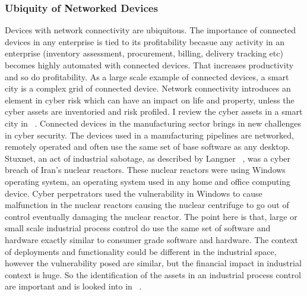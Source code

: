 \subsubsection{Ubiquity of Networked Devices}\label{sec:network_dev}
Devices with network connectivity are ubiquitous. The importance of connected devices in any enterprise is tied to its profitability becasue any activity in an enterprise (inventory assessment, procurement, billing, delivery tracking etc) becomes highly automated with connected devices. That increases productivity and so do profitability. As a large scale example of connected devices, a smart city is a complex grid of connected device. Network connectivity introduces an element in cyber risk which can have an impact on life and property, unless the cyber assets are inventoried and risk profiled. I review the cyber assets in a smart city in ~\cite{7580812}.
Connected devices in the manufacturing sector brings in new challenges in cyber security. The devices used in a manufacturing pipelines are networked, remotely operated and often use the same set of base software as any desktop. Stuxnet, an act of industrial sabotage, as described by Langner ~\cite{5772960}, was a cyber breach of Iran's nuclear reactors. These nuclear reactors were using Windows operating system, an operating system used in any home and office computing device. Cyber perpetrators used the vulnerability in Windows to cause malfunction in the nuclear reactors causing the nuclear centrifuge to go out of control eventually damaging the nuclear reactor. The point here is that, large or small scale industrial process control do use the same set of software and hardware exactly similar to consumer grade software and hardware. The context of deployments and functionality could be different in the industrial space, however the vulnerability posed are similar, but the financial impact in industrial context is huge. So the identification of the assets in an industrial process control are important and is looked into in ~\cite{7145073}.

